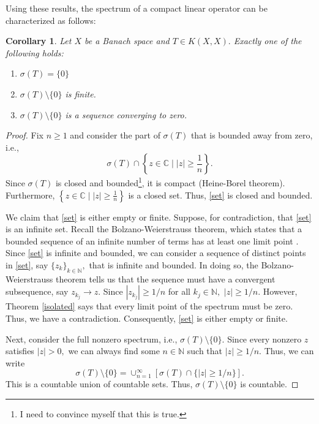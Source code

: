 \documentclass[12pt,a4paper]{article}
\theoremstyle{boldthm}
\newtheorem{corollary}[theorem]{Corollary}
\theoremstyle{bolddefn}
\begin{document}
Using these results, the spectrum of a compact linear operator can be characterized as follows:
\begin{corollary}
   Let $X$ be a Banach space and $T \in K(X, X).$ Exactly one of the following holds:
   \begin{enumerate}
       \item $\sigma(T) = \{0\}$
       \item $\sigma(T) \setminus \{0\}$ is finite.
       \item $\sigma(T) \setminus \{0\}$ is a sequence converging to zero.
   \end{enumerate}
\end{corollary}
\begin{proof}
    Fix $n \ge 1$ and consider the part of $\sigma(T)$ that is bounded away from zero, i.e.,
    \begin{equation} \label{set}
        \sigma(T) \cap \left\{z \in \mathbb{C} \mid |z|\ge \frac{1}{n} \right\}.
    \end{equation}
Since $\sigma(T)$ is closed and bounded\footnote{I need to convince myself that this is true.}, it is compact (Heine-Borel theorem). Furthermore, $\left\{z \in \mathbb{C} \mid |z|\ge \frac{1}{n} \right\}$ is a closed set. 
Thus, \eqref{set} is closed and bounded. 

We claim that \eqref{set} is either empty or finite. Suppose, for contradiction, that \eqref{set} is an infinite set. Recall the Bolzano-Weierstrauss theorem, which states that a bounded sequence of an infinite number of terms has at least one limit point \cite{krey}. Since \eqref{set} is infinite and bounded, we can consider a sequence of distinct points in \eqref{set}, say $\{z_k\}_{k \in \mathbb{N}},$ that is infinite and bounded. In doing so, the Bolzano-Weierstrauss theorem tells us that the sequence must have a convergent subsequence, say $z_{k_j} \rightarrow z.$ Since $|z_{k_j}| \ge 1/n$ for all $k_j \in \mathbb{N},$ $| z | \ge 1/n.$ However, Theorem \ref{isolated} says that every limit point of the spectrum must be zero. Thus, we have a contradiction. Consequently, \eqref{set} is either empty or finite.

Next, consider the full nonzero spectrum, i.e., $\sigma(T) \setminus\{0\}.$ Since every nonzero $z$ satisfies $|z|>0,$ we can always find some $n \in \mathbb{N}$ such that $|z| \ge 1/n.$ Thus, we can write 
\begin{equation}
    \sigma(T) \setminus \{0\} = \cup_{n=1}^{\infty} \left[ \sigma(T) \cap \{ |z| \ge 1/n  \} \right].
\end{equation}
This is a countable union of countable sets. Thus, $\sigma(T) \setminus \{0\}$ is countable. 


\end{proof}
\end{document}
